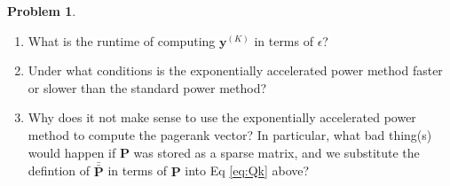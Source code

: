 \documentclass[10pt]{exam}
\theoremstyle{definition}
\newtheorem{problem}{Problem}
\newcommand{\p}{\mathbf P}
\newcommand{\pb}{\bar {\p}}
\newcommand{\pbb}{\bar {\pb}}
\newcommand{\y}{\mathbf y}
\begin{document}
\begin{problem}
\begin{enumerate}

            \vspace{3.5in}
        \item
            What is the runtime of computing $\y^{(K)}$ in terms of $\epsilon$?
            \vspace{4.5in}

        \newpage
        \item
            Under what conditions is the exponentially accelerated power method faster or slower than the standard power method?
            \vspace{4in}


        \item
            Why does it not make sense to use the exponentially accelerated power method to compute the pagerank vector?
            In particular, what bad thing(s) would happen if $\p$ was stored as a sparse matrix, and we substitute the defintion of $\pbb$ in terms of $\p$ into Eq \ref{eq:Qk} above?
            \vspace{4in}
%
    \end{enumerate}
\end{problem}
\end{document}
